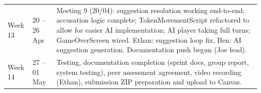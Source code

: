 \begin{longtable}{llp{10cm}}
Week 13 & 20 -- 26 Apr & Meeting 9 (20/04): suggestion resolution working end-to-end; accusation logic complete; TokenMovementScript refactored to allow for easier AI implementation; AI player taking full turns; GameOverScreen wired. Ethan: suggestion loop fix. Ben: AI suggestion generation. Documentation push begun (Joe lead). \\
Week 14 & 27 -- 01 May & Testing, documentation completion (sprint docs, group report, system testing), peer assessment agreement, video recording (Ethan), submission ZIP preparation and upload to Canvas. \\
\bottomrule
\end{longtable}
